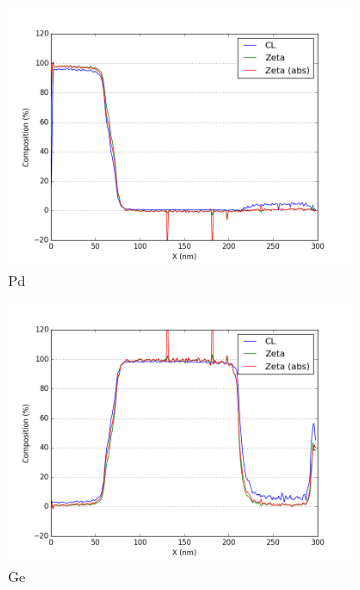\begin{figure}
	\begin{subfigure}{.5\textwidth}
		\centering
		\includegraphics[width=\linewidth]{fig/q/2_Pd2}
		\caption{Pd}
		\label{fig:zeta_area2_pd}
	\end{subfigure}%
	\begin{subfigure}{.5\textwidth}
		\centering
		\includegraphics[width=\linewidth]{fig/q/2_Ge2}
		\caption{Ge}
		\label{fig:zeta_area2_ge}
	\end{subfigure}
	\begin{subfigure}{.5\textwidth}
		\centering

\end{subfigure}
\end{figure}
